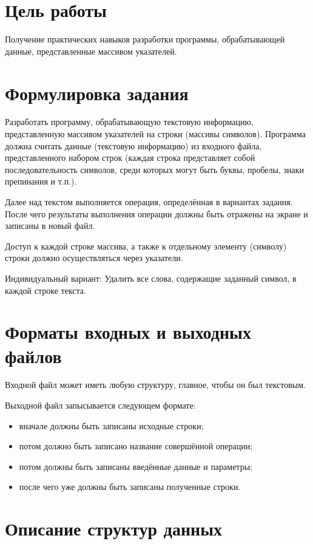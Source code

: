 \documentclass[12pt,a4paper]{article}  %
\begin{document}
	\section*{Цель работы}
	
	Получение
	практических
	навыков
	разработки
	программы,
	обрабатывающей данные, представленные массивом указателей.
	
	\section*{Формулировка задания}
	
	Разработать программу, обрабатывающую текстовую информацию,
	представленную массивом указателей на строки (массивы символов).
	Программа должна считать данные (текстовую информацию) из
	входного файла, представленного набором строк (каждая строка
	представляет собой последовательность символов, среди которых могут быть
	буквы, пробелы, знаки препинания и т.п.). 
	
	Далее над текстом выполняется
	операция, определённая в вариантах задания. После чего результаты
	выполнения операции должны быть отражены на экране и записаны в новый
	файл.
	
	Доступ к каждой строке массива, а также к отдельному элементу
	(символу) строки должно осуществляться через указатели.
	
	Индивидуальный вариант: Удалить все слова, содержащие заданный символ, в каждой строке текста.
	
	\section*{Форматы входных и выходных файлов}
	
	Входной файл может иметь любую структуру, главное, чтобы он был текстовым.
	
	Выходной файл запысывается следующем формате:
	\begin{itemize}
		\item вначале должны быть записаны исходные строки;
		\item потом должно быть записано название совершённой операции;
		\item потом должны быть записаны введённые данные и параметры;
		\item после чего уже должны быть записаны полученные строки.
	\end{itemize}
	
	\newpage
	\section*{Описание структур данных}
	
\end{document}
